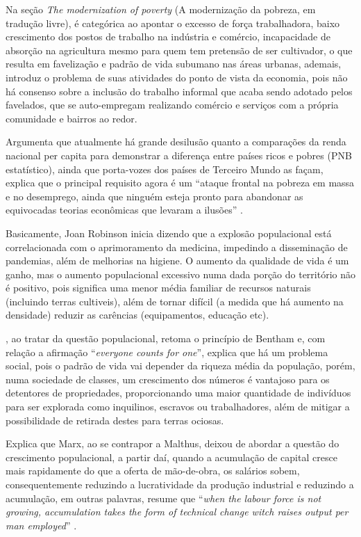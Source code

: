 	Na seção \textit{The modernization of poverty} (A modernização da pobreza, em tradução livre),  é categórica ao apontar o excesso de força trabalhadora, baixo crescimento dos postos de trabalho na indústria e comércio, incapacidade de absorção na agricultura mesmo para quem tem pretensão de ser cultivador, o que resulta em favelização e padrão de vida subumano nas áreas urbanas, ademais, introduz o problema de suas atividades do ponto de vista da economia, pois não há consenso sobre a inclusão do trabalho informal que acaba sendo adotado pelos favelados, que se auto-empregam realizando comércio e serviços com a própria comunidade e bairros ao redor.
	
	Argumenta que atualmente há grande desilusão quanto a comparações da renda nacional per capita para demonstrar a diferença entre países ricos e pobres (PNB estatístico), ainda que porta-vozes dos países de Terceiro Mundo as façam, explica que o principal requisito agora é um ``ataque frontal na pobreza em massa e no desemprego, ainda que ninguém esteja pronto para abandonar as equivocadas teorias econômicas que levaram a ilusões'' \cite[pág. 6]{Robinson1979}.
	
	Basicamente, Joan Robinson inicia dizendo que a explosão populacional está correlacionada com o aprimoramento da medicina, impedindo a disseminação de pandemias, além de melhorias na higiene. O aumento da qualidade de vida é um ganho, mas o aumento populacional excessivo numa dada porção do território não é positivo, pois significa uma menor média familiar de recursos naturais (incluindo terras cultiveis), além de tornar difícil (a medida que há aumento na densidade) reduzir as carências (equipamentos, educação etc).
	
	, ao tratar da questão populacional, retoma o princípio de Bentham e, com relação a afirmação ``\textit{everyone counts for one}'', explica que há um problema social, pois o padrão de vida vai depender da riqueza média da população, porém, numa sociedade de classes, um crescimento dos números é vantajoso para os detentores de propriedades, proporcionando uma maior quantidade de indivíduos para ser explorada como inquilinos, escravos ou trabalhadores, além de mitigar a possibilidade de retirada destes para terras ociosas.
	
	Explica que Marx, ao se contrapor a Malthus, deixou de abordar a questão do crescimento populacional, a partir daí, quando a acumulação de capital cresce mais rapidamente do que a oferta de mão-de-obra, os salários sobem, consequentemente reduzindo a lucratividade da produção industrial e reduzindo a acumulação, em outras palavras, resume que ``\textit{when the labour force is not growing, accumulation takes the form of technical change witch raises output per man employed}'' \cite[pág. 8]{Robinson1979}.
	
